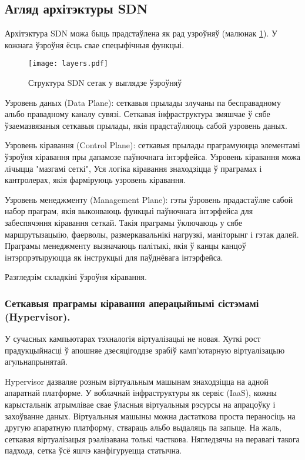 \subsection{Агляд архітэктуры SDN}

Архітэктура SDN можа быць прадстаўлена як рад узроўняў (малюнак \ref{img: Layers}).
У кожнага ўзроўня ёсць свае спецыфічныя функцыі.
\begin{figure}[ht!]
    \centering
    \texttt{[image: layers.pdf]}
    \vspace{-\baselineskip}
    \caption{Структура SDN сетак у выглядзе ўзроўняў}
    \label{img: Layers}
\end{figure}

Узровень даных (Data Plane): сеткавыя прылады злучаны па бесправадному альбо
правадному каналу сувязі. Сеткавая інфраструктура змяшчае ў сябе ўзаемазвязаныя
сеткавыя прылады, якія прадстаўляюць сабой узровень даных.

Узровень кіравання (Control Plane): сеткавыя прылады праграмуюцца элементамі
ўзроўня кіравання пры дапамозе паўночнага інтэрфейса. Узровень кіравання
можа лічыцца "мазгамі сеткі", Уся логіка кіравання знаходзіцца ў праграмах і кантролерах,
якія фарміруюць узровень кіравання.

Узровень менеджменту (Management Plane): гэты ўзровень прадастаўляе сабой
набор праграм, якія выконваюць функцыі паўночнага інтэрфейса для забеспячэння
кіравання сеткай. Такія праграмы ўключаюць у сябе маршрутызацыію, фаерволы,
размеркавальнікі нагрузкі, маніторынг і гэтак далей.
Праграмы менеджменту вызначаюць палітыкі, якія ў канцы канцоў інтэрпрэтыруюцца
як інструкцыі для паўднёвага інтэрфейса.

Разгледзім складкіні ўзроўня кіравання.

\subsubsection{Сеткавыя праграмы кіравання аперацыйнымі сістэмамі (Hypervisor).}
У сучасных кампьютарах тэхналогія віртуалізацыі не новая.
Хуткі рост прадукцыйнасці ў апошняе дзесяцігоддзе зрабіў камп'ютарную віртуалізацыю
агульнапрынятай.

Hypervisor дазваляе розным віртуальным машынам знаходзіцца на адной апаратнай платформе. У воблачнай інфраструктуры як сервіс (IaaS), кожны карыстальнік
атрымлівае свае ўласныя віртуальныя рэсурсы на апрацоўку і захоўванне даных.
Віртуальныя машыны можна дастаткова проста пераносіць на другую апаратную платформу,
ствараць альбо выдаляць па запыце. На жаль, сеткавая віртуалізацыя рэалізавана
толькі часткова. Нягледзячы на перавагі такога падхода, сетка ўсё яшчэ канфігуруецца статычна.

